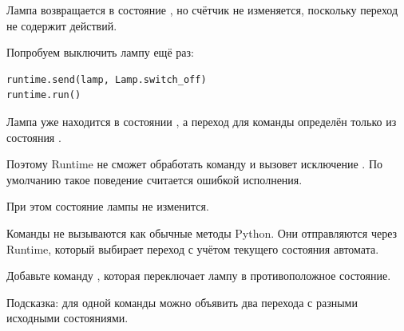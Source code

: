 Лампа возвращается в состояние ,
но счётчик не изменяется, поскольку переход
 не содержит действий.

Попробуем выключить лампу ещё раз:

\begin{lstlisting}[language=Python,numbers=none]
runtime.send(lamp, Lamp.switch_off)
runtime.run()
\end{lstlisting}

Лампа уже находится в состоянии , а переход
для команды  определён только из
состояния .

Поэтому Runtime не сможет обработать команду и вызовет
исключение . По умолчанию такое
поведение считается ошибкой исполнения.

При этом состояние лампы не изменится.

\begin{importantbox}
Команды не вызываются как обычные методы Python.
Они отправляются через Runtime, который выбирает
переход с учётом текущего состояния автомата.
\end{importantbox}

\begin{trybox}
Добавьте команду , которая переключает
лампу в противоположное состояние.

Подсказка: для одной команды можно объявить два
перехода с разными исходными состояниями.
\end{trybox}
